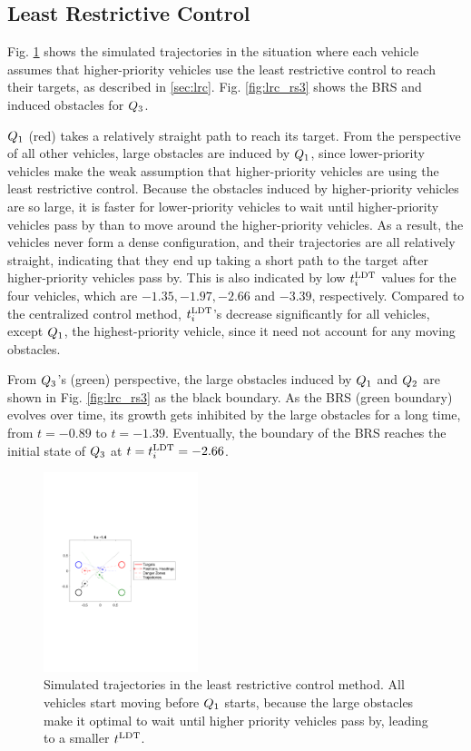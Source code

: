 \subsection{Least Restrictive Control}
Fig. \ref{fig:lrc_traj} shows the simulated trajectories in the situation where each vehicle assumes that higher-priority vehicles use the least restrictive control to reach their targets, as described in \ref{sec:lrc}. Fig. \ref{fig:lrc_rs3} shows the BRS and induced obstacles for $Q_3$.

$Q_1$ (red) takes a relatively straight path to reach its target. From the perspective of all other vehicles, large obstacles are induced by $Q_1$, since lower-priority vehicles make the weak assumption that higher-priority vehicles are using the least restrictive control. Because the obstacles induced by higher-priority vehicles are so large, it is faster for lower-priority vehicles to wait until higher-priority vehicles pass by than to move around the higher-priority vehicles. As a result, the vehicles never form a dense configuration, and their trajectories are all relatively straight, indicating that they end up taking a short path to the target after higher-priority vehicles pass by. This is also indicated by low $t^\text{LDT}_i$ values for the four vehicles, which are $-1.35, -1.97, -2.66$ and $-3.39$, respectively. Compared to the centralized control method, $t^\text{LDT}_i$'s decrease significantly for all vehicles, except $Q_1$, the highest-priority vehicle, since it need not account for any moving obstacles. 

From $Q_3$'s (green) perspective, the large obstacles induced by $Q_1$ and $Q_2$ are shown in Fig. \ref{fig:lrc_rs3} as the black boundary. As the BRS (green boundary) evolves over time, its growth gets inhibited by the large obstacles for a long time, from $t=-0.89$ to $t=-1.39$. Eventually, the boundary of the BRS reaches the initial state of $Q_3$ at $t = t^\text{LDT}_i = -2.66$.

\begin{figure}
  \centering
  \includegraphics[width=0.40\textwidth]{"fig/lrc_traj"}
  \caption{Simulated trajectories in the least restrictive control method. All vehicles start moving before $Q_1$ starts, because the large obstacles make it optimal to wait until higher priority vehicles pass by, leading to a smaller $t^\text{LDT}$. }
  \label{fig:lrc_traj}
  \vspace{-2em}
\end{figure}

